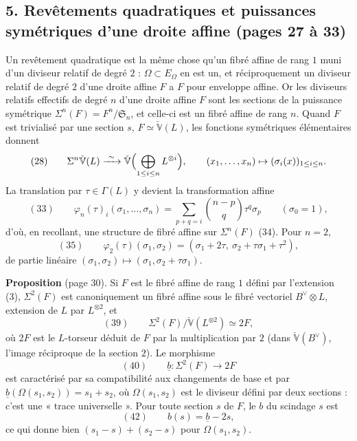 \documentclass[11pt,a4paper]{article}
\begin{document}
\subsection*{5. Revêtements quadratiques et puissances symétriques d'une droite affine (pages 27 à 33)}

Un revêtement quadratique est la même chose qu'un fibré affine de rang $1$ muni
d'un diviseur relatif de degré $2$ : $\Omega \subset E_\Omega$ en est un, et
réciproquement un diviseur relatif de degré $2$ d'une droite affine $F$ a $F$ pour
enveloppe affine. Or les diviseurs relatifs effectifs de degré $n$ d'une droite
affine $F$ sont les sections de la puissance symétrique $\Sigma^n(F) =
F^n/\mathfrak{S}_n$, et celle-ci est un fibré affine de rang $n$. Quand $F$ est
trivialisé par une section $s$, $F \simeq \check{\mathbb{V}}(L)$, les fonctions
symétriques élémentaires donnent
\[
  (28) \qquad \Sigma^n\check{\mathbb{V}}(L) \xrightarrow{\ \sim\ }
  \check{\mathbb{V}}\Bigl(\bigoplus_{1 \leq i \leq n} L^{\otimes i}\Bigr), \qquad
  (x_1, \ldots, x_n) \mapsto (\sigma_i(x))_{1 \leq i \leq n}.
\]
La translation par $\tau \in \Gamma(L)$ y devient la transformation affine
\[
  (33) \qquad \varphi_n(\tau)_i(\sigma_1, \ldots, \sigma_n) = \sum_{p + q = i}
  \binom{n - p}{q} \tau^q \sigma_p \qquad (\sigma_0 = 1),
\]
d'où, en recollant, une structure de fibré affine sur $\Sigma^n(F)$ (34). Pour
$n = 2$,
\[
  (35) \qquad \varphi_2(\tau)(\sigma_1, \sigma_2) = (\sigma_1 + 2\tau,\ \sigma_2 +
  \tau\sigma_1 + \tau^2),
\]
de partie linéaire $(\sigma_1, \sigma_2) \mapsto (\sigma_1, \sigma_2 + \tau\sigma_1)$.

\textbf{Proposition} (page 30). Si $F$ est le fibré affine de rang $1$ défini par
l'extension (3), $\Sigma^2(F)$ est canoniquement un fibré affine sous le fibré
vectoriel $B^{\vee} \otimes L$, extension de $L$ par $L^{\otimes 2}$, et
\[
  (39) \qquad \Sigma^2(F)/\check{\mathbb{V}}(L^{\otimes 2}) \simeq 2F,
\]
où $2F$ est le $L$-torseur déduit de $F$ par la multiplication par $2$ (dans
$\check{\mathbb{V}}(B^{\vee})$, l'image réciproque de la section $2$). Le morphisme
\[
  (40) \qquad \underline{b} : \Sigma^2(F) \to 2F
\]
est caractérisé par sa compatibilité aux changements de base et par
$\underline{b}(\Omega(s_1, s_2)) = s_1 + s_2$, où $\Omega(s_1, s_2)$ est le diviseur
défini par deux sections : c'est une « trace universelle ». Pour toute section
$s$ de $F$, le $b$ du scindage $s$ est
\[
  (42) \qquad b(s) = \underline{b} - 2s ,
\]
ce qui donne bien $(s_1 - s) + (s_2 - s)$ pour $\Omega(s_1, s_2)$.
\end{document}
